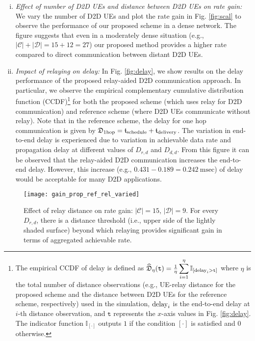\documentclass[twocolumn,10pt]{IEEEtran}
\begin{document}
\begin{enumerate}[(i)]
\item \textit{Effect of number of D2D UEs and distance between D2D UEs on rate gain:} We vary the number of D2D UEs and plot the rate gain in Fig. \ref{fig:scal} to observe the performance of our proposed scheme in a dense network. The figure suggests that even in a moderately dense situation (e.g., $|\mathcal{C}| + |\mathcal{D}| = 15 + 12 = 27$) our proposed method provides a higher rate compared to direct communication between distant D2D UEs.


\item \textit{Impact of  relaying on delay:} In Fig. \ref{fig:delay}, we show results on the delay performance of the proposed relay-aided D2D communication approach. In particular, we observe the empirical complementary cumulative distribution function (CCDF)\footnote{The empirical CCDF of delay is defined as $\widehat{\mathfrak{D}}_\eta(\mathtt{t}) = \frac{1}{\eta} \displaystyle \sum_{i=1}^\eta \mathbb{I}_{[{\rm delay}_i > \mathtt{t}]}$ where $\eta$ is the total number of distance observations (e.g., UE-relay distance for the proposed scheme and the distance between D2D UEs for the reference scheme, respectively) used in the simulation, ${\rm delay}_i$ is the end-to-end delay at $i$-th distance observation, and $\mathtt{t}$  represents the $x$-axis values in Fig. \ref{fig:delay}. The indicator function $\mathbb{I}_{[\cdot]}$ outputs $1$ if the condition $[\cdot]$ is satisfied and $0$ otherwise.} for both the proposed scheme (which uses relay for D2D communication) and reference scheme (where D2D UEs communicate without relay). Note that in the reference scheme, the delay for one hop communication is given by $\mathfrak{D}_{\rm 1 hop} = \mathfrak{t}_{\rm schedule} + \mathfrak{t}_{\rm delivery}$. The variation in end-to-end delay is experienced due to variation in achievable data rate and propagation delay at different values of $D_{r,d}$ and $D_{d,d}$. From this figure it can be observed that the relay-aided D2D communication increases the end-to-end delay. However,  this increase (e.g., $0.431 - 0.189 = 0.242~  \text{msec}$) of delay would be acceptable for many D2D applications.




\end{enumerate}

\begin{figure}[h t b]
\centering
\texttt{[image: gain\_prop\_ref\_rel\_varied]}
\caption{Effect of relay distance on rate gain: $|\mathcal{C}| = 15$,  $|\mathcal{D}| = 9$. For every $D_{r,d}$, there is a distance threshold (i.e., upper side of the lightly shaded surface) beyond which relaying provides significant gain in terms of aggregated achievable rate.} 
\label{fig:rel_var_mp}
\end{figure}
\end{document}
